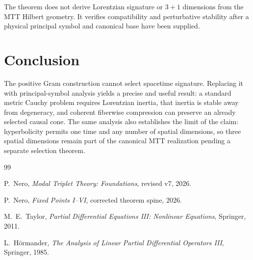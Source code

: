 \documentclass[11pt]{article}
\begin{document}
The theorem does not derive Lorentzian signature or $3+1$ dimensions from the
MTT Hilbert geometry. It verifies compatibility and perturbative stability
after a physical principal symbol and canonical base have been supplied.

\section{Conclusion}

The positive Gram construction cannot select spacetime signature. Replacing it
with principal-symbol analysis yields a precise and useful result: a standard
metric Cauchy problem requires Lorentzian inertia, that inertia is stable away
from degeneracy, and coherent fiberwise compression can preserve an already
selected causal cone. The same analysis also establishes the limit of the
claim: hyperbolicity permits one time and any number of spatial dimensions, so
three spatial dimensions remain part of the canonical MTT realization pending
a separate selection theorem.

\begin{thebibliography}{99}

P.~Nero,
\newblock \emph{Modal Triplet Theory: Foundations}, revised v7, 2026.

P.~Nero,
\newblock \emph{Fixed Points I--VI}, corrected theorem spine, 2026.

M.~E.~Taylor,
\newblock \emph{Partial Differential Equations III: Nonlinear Equations},
\newblock Springer, 2011.

L.~H\"ormander,
\newblock \emph{The Analysis of Linear Partial Differential Operators III},
\newblock Springer, 1985.

\end{thebibliography}
\end{document}
